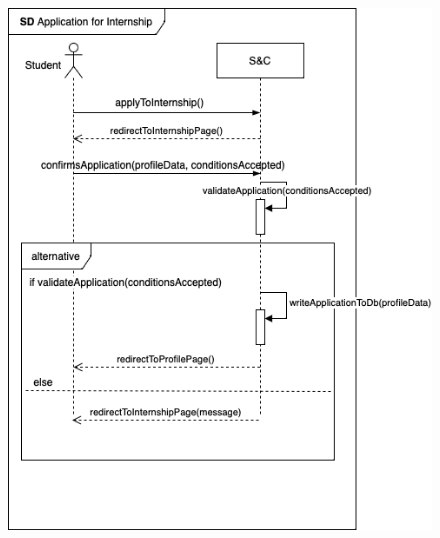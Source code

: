                 \begin{figure}[h!]
                \centering   \includegraphics{RASD/Images/UseCases/InternshipApplication.drawio.png}
                \label{fig: Application for Internship}
                \end{figure}



\newpage
